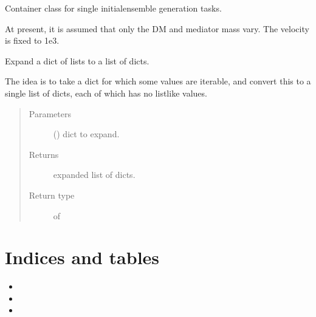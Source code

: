 \documentclass[letterpaper,10pt,english]{sphinxmanual}
\begin{document}

\begin{fulllineitems}
\label{\detokenize{interface:scdc.interface.InitialTask}}
Container class for single initial\sphinxhyphen{}ensemble generation tasks.

At present, it is assumed that only the DM and mediator mass vary. The
velocity is fixed to 1e\sphinxhyphen{}3.

\end{fulllineitems}


\begin{fulllineitems}
\label{\detokenize{interface:scdc.interface.expand_dict}}
Expand a dict of lists to a list of dicts.

The idea is to take a dict for which some values are iterable, and convert
this to a single list of dicts, each of which has no listlike values.
\begin{quote}\begin{description}
\item[{Parameters}] \leavevmode
{} () \textendash{} dict to expand.

\item[{Returns}] \leavevmode
expanded list of dicts.

\item[{Return type}] \leavevmode
{} of 

\end{description}\end{quote}

\end{fulllineitems}



\chapter{Indices and tables}
\label{\detokenize{index:indices-and-tables}}\begin{itemize}
\item {} 

\item {} 

\item {} 

\end{itemize}
\end{document}
